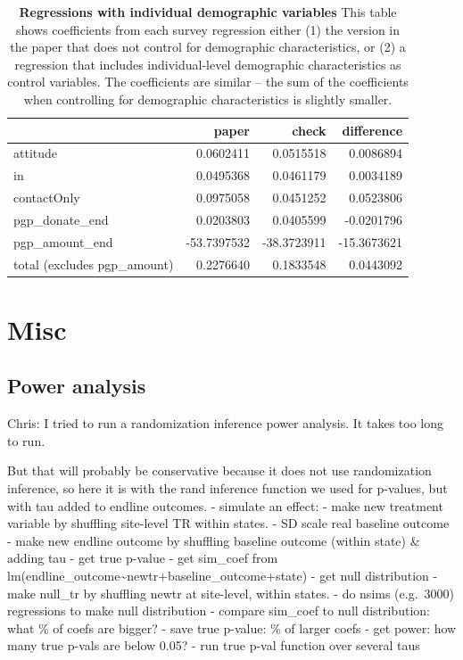 \documentclass[
]{article}
\begin{document}
\begin{table}[H]
\begin{center}
\label{tab:comp_df_ind1}
\caption{\textbf{Regressions with individual demographic variables} This table shows coefficients from each survey regression either (1) the version in the paper that does not control for demographic characteristics, or (2) a regression that includes individual-level demographic characteristics as control variables. The coefficients are similar -- the sum of the coefficients when controlling for demographic characteristics is slightly smaller.}
\smallskip

\begin{tabular}{l|r|r|r}
\hline
  & paper & check & difference\\
\hline
attitude & 0.0602411 & 0.0515518 & 0.0086894\\
\hline
in & 0.0495368 & 0.0461179 & 0.0034189\\
\hline
contactOnly & 0.0975058 & 0.0451252 & 0.0523806\\
\hline
pgp\_donate\_end & 0.0203803 & 0.0405599 & -0.0201796\\
\hline
pgp\_amount\_end & -53.7397532 & -38.3723911 & -15.3673621\\
\hline
total (excludes pgp\_amount) & 0.2276640 & 0.1833548 & 0.0443092\\
\hline
\end{tabular}


\end{center}
\end{table}

\hypertarget{misc}{%
\section{Misc}\label{misc}}

\hypertarget{power-analysis}{%
\subsection{Power analysis}\label{power-analysis}}

Chris: I tried to run a randomization inference power analysis. It takes
too long to run.

But that will probably be conservative because it does not use
randomization inference, so here it is with the rand inference function
we used for p-values, but with tau added to endline outcomes. - simulate
an effect: - make new treatment variable by shuffling site-level TR
within states. - SD scale real baseline outcome - make new endline
outcome by shuffling baseline outcome (within state) \& adding tau - get
true p-value - get sim\_coef from
lm(endline\_outcome\textasciitilde newtr+baseline\_outcome+state) - get
null distribution - make null\_tr by shuffling newtr at site-level,
within states. - do nsims (e.g.~3000) regressions to make null
distribution - compare sim\_coef to null distribution: what \% of coefs
are bigger? - save true p-value: \% of larger coefs - get power: how
many true p-vals are below 0.05? - run true p-val function over several
taus
\end{document}
